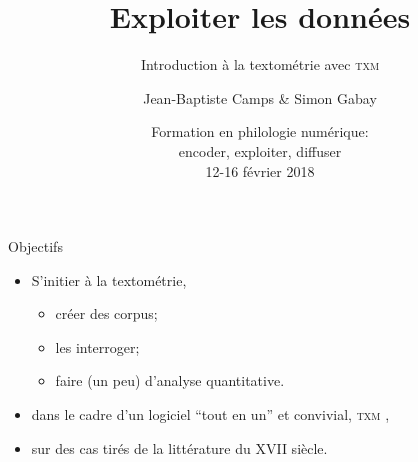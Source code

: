 \documentclass{beamer}
\institute{Univ. de Neuchâtel}
\title{Exploiter les données}
\subtitle{Introduction à la textométrie avec \textsc{txm}}
\author{Jean-Baptiste Camps \& Simon Gabay}
\date[FoPhil -- 14 févr. 2018]{Formation en philologie numérique:\\ encoder, exploiter, diffuser\\
12-16 février 2018}
\begin{document}
\maketitle
  


\begin{frame}{Objectifs}
	
	\begin{itemize}
		\item S'initier à la \alert{textométrie},
		\begin{itemize}
			\item créer des corpus;
			\item les interroger;
			\item faire (un peu) d'analyse quantitative.
		\end{itemize}
		\item dans le cadre d'un logiciel ``tout en un'' et convivial, 
	\alert{\textsc{txm}} \cite{Heiden2010},
		\item sur des cas tirés de la littérature du XVII\ieme{} siècle.
	\end{itemize}
	
\end{frame}
\end{document}
